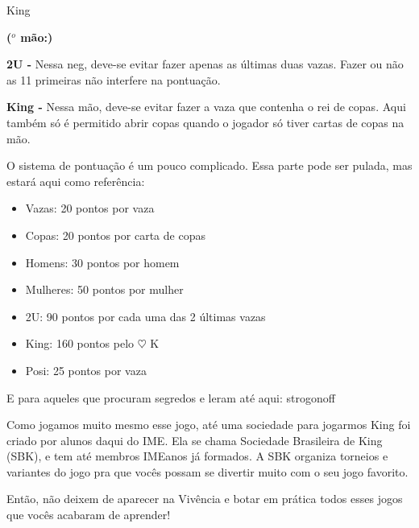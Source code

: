 \begin{subsecao}{King}
\begin{list}{\textbf{ ($^{o}$ mão:)}}{}
\item \textbf{2U -} Nessa neg, deve-se evitar fazer apenas as últimas duas
vazas. Fazer ou não as 11 primeiras não interfere na pontuação.

\item \textbf{King -} Nessa mão, deve-se evitar fazer a vaza que contenha o rei
de copas. Aqui também só é permitido abrir copas quando o jogador só tiver
cartas de copas na mão.

\end{list}

O sistema de pontuação é um pouco complicado. Essa parte pode ser pulada, mas
estará aqui como referência:
\begin{itemize}

\item Vazas:	  20 pontos por vaza
\item Copas:	  20 pontos por carta de copas
\item Homens:	  30 pontos por homem
\item Mulheres: 50 pontos por mulher
\item 2U:	  90 pontos por cada uma das 2 últimas vazas
\item King:    160 pontos pelo $\heartsuit$ K
\item Posi:	  25 pontos por vaza

\end{itemize}

E para aqueles que procuram segredos e leram até aqui: strogonoff

Como jogamos muito mesmo esse jogo, até uma sociedade para jogarmos King foi
criado por alunos daqui do IME. Ela se chama Sociedade Brasileira de King (SBK),
e tem até membros IMEanos já formados. A SBK organiza torneios e variantes do
jogo pra que vocês possam se divertir muito com o seu jogo favorito.

Então, não deixem de aparecer na Vivência e botar em prática todos esses jogos
que vocês acabaram de aprender!

\end{subsecao}
